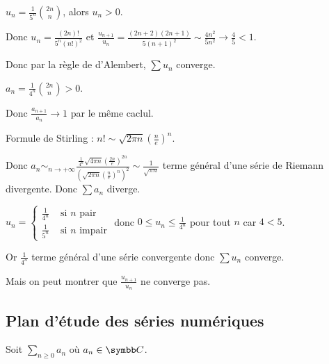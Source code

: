 \begin{exemple}
    $u_n = \frac{1 }{5^n } \binom{2n}{n}$, alors $u_n > 0$. 

    Donc $\displaystyle u_n = \frac{(2n)!}{5^n (n!)^2}$ et $\frac{u_{n + 1}}{u_n} = \frac{(2n + 2)(2n + 1)}{5 (n + 1)^2} \sim \frac{4 n^2}{5 n^2} \longrightarrow \frac 4 5 < 1$.

    Donc par la règle de d'Alembert, $\sum u_n$ converge.

    \lvspace $\displaystyle a_n = \frac{1}{4^n} \binom{2n}{n} > 0$. 

    Donc $\frac{a_{n + 1}}{a_n} \longrightarrow 1$ par le même caclul. 

    Formule de Stirling : $n! \sim \sqrt{2 \pi n} \left( \frac{n}{e} \right)^n$.

    \svspace Donc $\displaystyle a_n \sim_{n \to + \infty} \frac{\frac{1}{4^n} \sqrt{4 \pi n} \left( \frac{2n} e \right)^{2n}}{\left( \sqrt{2 \pi n} \left( \frac{n}{e} \right)^n \right)^2 } \sim \frac 1 {\sqrt{ \pi n}}$
    terme général d'une série de Riemann divergente. 
    Donc $\sum a_n$ diverge.

    \lvspace $u_n = \left\{ \begin{array}{rl}
        \frac{1}{4^n} & \text{ si } n \text{ pair} \\
        \frac{1}{5^n} & \text{ si } n \text{ impair}
    \end{array} \right.$
    donc $0 \leqslant u_n \leqslant \frac 1 {4^n}$ pour tout $n$ car $4 < 5$.

    Or $\frac 1 {4^n}$ terme général d'une série convergente donc $\sum u_n$ converge. 

    Mais on peut montrer que $\frac{u_{n + 1}}{u_n}$ ne converge pas.
\end{exemple}

\subsection{Plan d'étude des séries numériques}

Soit $\displaystyle \sum_{n \ge 0} a_n$ où $a_n \in \C$.

